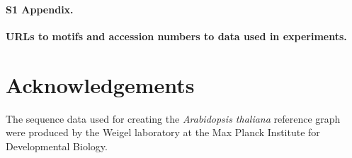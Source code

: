 \documentclass[10pt,letterpaper]{article}
\begin{document}
\paragraph*{S1 Appendix.}
\label{S1_Appendix}
{\bf URLs to motifs and accession numbers to data used in experiments.}

\section*{Acknowledgements}
The sequence data used for creating the \emph{Arabidopsis thaliana} reference graph were produced by the Weigel laboratory at the Max Planck Institute for Developmental Biology.

\nolinenumbers

%
%
% 
\end{document}
